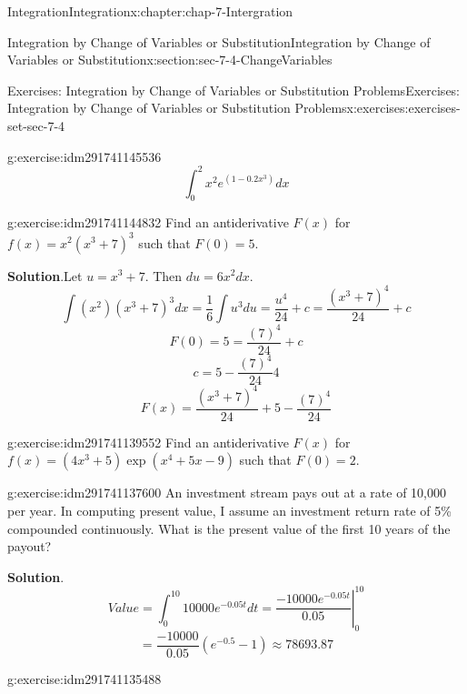 \documentclass[oneside,10pt,]{book}
\numberwithin{equation}{section}
\begin{document}
\begin{chapterptx}{Integration}{}{Integration}{}{}{x:chapter:chap-7-Intergration}
\begin{sectionptx}{Integration by Change of Variables or Substitution}{}{Integration by Change of Variables or Substitution}{}{}{x:section:sec-7-4-ChangeVariables}
\begin{exercises-subsection}{Exercises: Integration by Change of Variables or Substitution Problems}{}{Exercises: Integration by Change of Variables or Substitution Problems}{}{}{x:exercises:exercises-set-sec-7-4}
\begin{divisionexercise}{18}{}{}{g:exercise:idm291741145536}%
%
\begin{equation*}
\int_0^2 x^2 e^{(1-0.2x^3)} dx 
\end{equation*}
\end{divisionexercise}%
\begin{divisionexercise}{19}{}{}{g:exercise:idm291741144832}%
Find an antiderivative \(F(x)\) for \(f(x)=x^2(x^3+7)^3\) such that \(F(0)=5\).%
\par\smallskip%
\noindent\textbf{Solution}.\hypertarget{g:solution:idm291741143024}{}\quad{}Let \(u=x^3+7\).  Then \(du=6x^2 dx\).%
%
\begin{equation*}
\int (x^2 ) (x^3+7)^3 dx=\frac{1}{6} \int u^3 du=\frac{u^4}{24}+c=\frac{(x^3+7)^4}{24}+c
\end{equation*}
%
\begin{equation*}
F(0)=5=\frac{(7)^4}{24}+c
\end{equation*}
%
\begin{equation*}
c=5-\frac{(7)^4}{24}4
\end{equation*}
%
\begin{equation*}
F(x)=\frac{(x^3+7)^4}{24}+5-\frac{(7)^4}{24}
\end{equation*}
\end{divisionexercise}%
\begin{divisionexercise}{20}{}{}{g:exercise:idm291741139552}%
Find an antiderivative \(F(x)\)  for \(f(x)=(4x^3+5)\exp(x^4+5x-9)\) such that \(F(0)=2\).%
\end{divisionexercise}%
\begin{divisionexercise}{21}{}{}{g:exercise:idm291741137600}%
An investment stream pays out at a rate of \textdollar{}10,000 per year.  In computing present value, I assume an investment return rate of 5\% compounded continuously.  What is the present value of the first 10 years of the payout?%
\par\smallskip%
\noindent\textbf{Solution}.\hypertarget{g:solution:idm291741136864}{}\quad{}%
\begin{equation*}
Value=\int_0^{10}10000e^{-0.05t} dt
=\left.\frac{-10000e^{-0.05t}}{0.05}\right|_0^{10}
\end{equation*}
%
\begin{equation*}
=\frac{-10000}{0.05} (e^{-0.5}-1)
\approx 78693.87
\end{equation*}
\end{divisionexercise}%
\begin{divisionexercise}{22}{}{}{g:exercise:idm291741135488}%

\end{divisionexercise}
\end{exercises-subsection}
\end{sectionptx}
\end{chapterptx}
\end{document}
